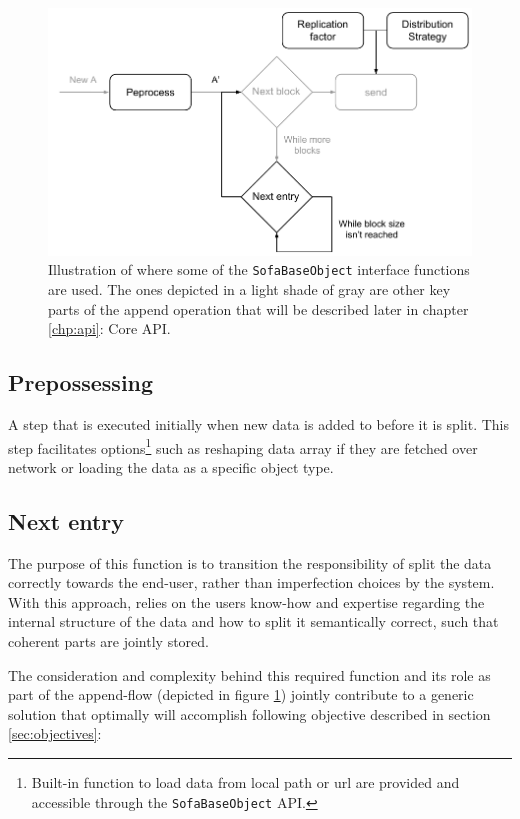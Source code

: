 \begin{figure}
	\centering
	\includegraphics[scale=0.8]{pdf/preprocess-nextentry.pdf}
	\caption[\texttt{SofaBaseObject} interface functions]{Illustration of where some of the \texttt{SofaBaseObject} interface functions are used. The ones depicted in a light shade of gray are other key parts of the append operation that will be described later in chapter \ref{chp:api}: Core API. \label{fig:preprocess-nextentry}}
\end{figure}	

\subsection{Prepossessing}
A step that is executed initially when new data is added to \CodeName before it is split. This step facilitates options\footnote{Built-in \CodeName function to load data from local path or url are provided and accessible through the \texttt{SofaBaseObject} API.} such as reshaping data array if they are fetched over network or loading the data as a specific object type.

\subsection{Next entry}
The purpose of this function is to transition the responsibility of split the data correctly towards the end-user, rather than imperfection choices by the system. With this approach, \CodeName relies on the users know-how and expertise regarding the internal structure of the data and how to split it semantically correct, such that coherent parts are jointly stored.
\newline

The consideration and complexity behind this required function and its role as part of the append-flow (depicted in figure \ref{fig:preprocess-nextentry}) jointly contribute to a generic solution that optimally will accomplish following objective described in section \ref{sec:objectives}: 

